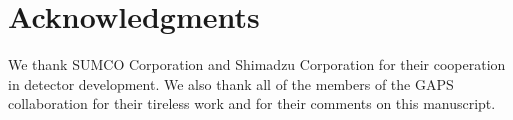\documentclass[journal]{IEEEtran}
\begin{document}
%





\section*{Acknowledgments}


We thank SUMCO Corporation and Shimadzu Corporation for their cooperation in detector development. We also thank all of the members of the GAPS collaboration for their tireless work and for their comments on this manuscript. 


\ifCLASSOPTIONcaptionsoff
  \newpage
\fi




\end{document}
